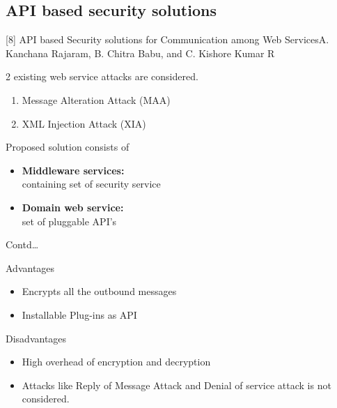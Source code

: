 \documentclass[10pt]{beamer}
\begin{document}
\subsection{API based security solutions}
\begin{frame}{[8] API based Security solutions for
Communication among Web Services}{A. Kanchana Rajaram, B. Chitra Babu, and C. Kishore Kumar R}
\begin{block}{}
2 existing web service attacks are considered.
\begin{enumerate}
\item Message Alteration Attack (MAA)
\item XML Injection Attack (XIA)
\end{enumerate}
Proposed solution consists of
\begin{itemize}
\item \textbf{Middleware services:}\\
containing set of security service
\item \textbf{Domain web service:}\\
set of pluggable API's
\end{itemize} 

\end{block}

\end{frame}
\begin{frame}{Contd\dots}
\begin{block}{Advantages}
\begin{itemize}
\item Encrypts all the outbound messages
\item Installable Plug-ins as API
\end{itemize}
\end{block}
\begin{block}{Disadvantages}
\begin{itemize}

\item High overhead of encryption and decryption
\item Attacks like Reply of Message Attack and Denial of service attack is not considered.

\end{itemize}
\end{block}
\end{frame}
\end{document}
